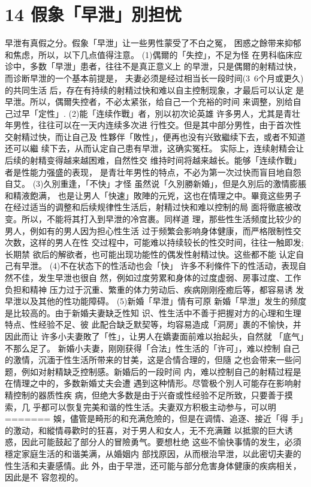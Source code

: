 \documentclass[12pt,UTF8]{ctexbook}
\begin{document}
\section{14 假象「早泄」別担忧}

早泄有真假之分。假象「早泄」让一些男性蒙受了不白之冤，
困惑之餘带来抑郁和焦虑，所以，以下几点值得注意。
(1)偶爾的「失控」，不足为怪
在男科临床应诊中，多数「早泄」患者，往往不是真正意义上
的早泄，只是偶爾的射精过快，而诊断早泄的一个基本前提是，
夫妻必须是经过相当长一段时间(3~6个月或更久)的共同生活
后，存在有持续的射精过快和难以自主控制现象，才最后可以认定
是早泄。所以，偶爾失控者，不必太紧张，给自己一个充裕的时间
来调整，別给自己过早「定性」.
(2)能「连续作戰」者，別以初次论英雄
许多男人，尤其是青壮年男性，往往可以在一天内连续多次进
行性交。但是其中部分男性，由于首次性交射精过快，而让自己及
性夥伴「敗性」，便再也没有兴致繼续下去，或者不知道还可以繼
续下去，从而认定自己患有早泄，这确实冤枉。
实际上，连续射精会让后续的射精变得越来越困难，自然性交
维持时间将越来越长。能够「连续作戰」者是性能力强盛的表现，
是青壮年男性的特点，不必为第一次过快而盲目地自怨自艾。
(3)久別重逢，「不快」才怪
虽然说「久別勝新婚」，但是久別后的激情膨脹和精液飽满，
也是让男人「快速」敗陣的元兇，这也在情理之中。畢竟这些男子
在经过适当的调整和后续规律性生活后，射精过快和难以控制的局
面将徹底被改变。所以，不能将其打入到早泄的冷宫裹。同样道
理，那些性生活频度比较少的男人，例如有的男人因为担心性生活
过于频繁会影响身体健康，而严格限制性交次数，这样的男人在性
交过程中，可能难以持续较长的性交时间，往往一触即发;长期禁
欲后的解欲者，也可能出现功能性的偶发性射精过快。这些都不能
认定自己有早泄。
(4)不在状态下的性活动也会「快」
许多不利條件下的性活动，表现自然不佳，发生早泄也很自
然，例如过度劳累和身体的过度虚弱、房事过度、工作负担和精神
压力过于沉重、繁重的体力劳动后、疾病刚刚痊癒后等，都容易诱
发早泄以及其他的性功能障碍。
(5)新婚「早泄」情有可原
新婚「早泄」发生的频度是比较高的。由于新婚夫妻缺乏性知
识、性生活中不善于把握对方的心理和生理特点、性经验不足、彼
此配合缺乏默契等，均容易造成「洞房」裹的不愉快，并因此而让
许多小夫妻敗了「性」，让男人在嬌妻面前难以抬起头，自然就
「底气」不那么足了。
新婚小夫妻，刚刚获得「合法」性生活的「许可」，难以控制
自己的激情，沉湎于性生活所带来的甘美，这是合情合理的，但隨
之也会带来一些问题，例如对射精缺乏控制感。新婚后的一段时间
内，难以控制自己的射精过程是在情理之中的，多数新婚丈夫会遭
遇到这种情形。尽管极个別人可能存在影响射精控制的器质性疾
病，但绝大多数是由于兴奋或性经验不足所致，只要善于摸索，几
乎都可以恢复完美和谐的性生活。夫妻双方积极主动参与，可以明
=======
娛，儘管是畸形的和充满危險的，但是在调情、追逐、接近「得
手」的激动，和縱情尋歡时的狂喜，对于男人和女人，无不充满難
以抵禦的巨大诱惑，因此可能鼓起了部分人的冒險勇气。要想杜绝
这些不愉快事情的发生，必須穩定家庭生活的和谐美满，从婚姻内
部找原因，从而根治早泄，以此密切夫妻的性生活和夫妻感情。此
外，由于早泄，还可能与部分危害身体健康的疾病相关，因此是不
容忽视的。
\end{document}
